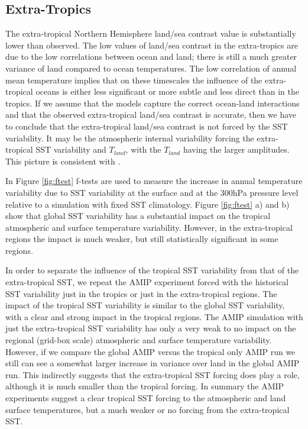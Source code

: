 
\subsection{Extra-Tropics}

The extra-tropical Northern Hemisphere land/sea contrast value is substantially 
lower than observed. The low values of land/sea contrast in the extra-tropics 
are due to the low correlations between ocean and land; there is still a much 
greater variance of land compared to ocean temperatures. The low correlation of 
annual mean temperature implies that on these timescales the influence of the 
extra-tropical oceans is either less significant or more subtle and less direct 
than in the tropics. If we assume that the models capture the correct ocean-land 
interactions and that the observed extra-tropical land/sea contrast is accurate, 	
then we have to conclude that the extra-tropical land/sea contrast is not forced 
by the SST variability. It may be the atmospheric internal variability forcing 
the extra-tropical SST variability and $T_{land}$, with the $T_{land}$ having 
the larger amplitudes. This picture is consistent with \citet{Barsugli1998}.

In Figure \ref{fig:ftest} f-tests are used to measure the increase in annual 
temperature variability due to SST variability at the surface and at the 300hPa 
pressure level relative to a simulation with fixed SST climatology. Figure  
\ref{fig:ftest} a) and b) show that global SST variability has a substantial 
impact on the tropical atmospheric and surface temperature variability. However, 
in the extra-tropical regions the impact is much weaker, but still statistically 
significant in some regions.

In order to separate the influence of the tropical SST variability from that of 
the extra-tropical SST, we repeat the AMIP experiment forced with the historical 
SST variability just in the tropics or just in the extra-tropical regions. The 
impact of the tropical SST variability is similar to the global SST variability, 
with a clear and strong impact in the tropical regions.  The AMIP simulation 
with just the extra-tropical SST variability has only a very weak to no impact 
on the regional (grid-box scale) atmospheric and surface temperature 
variability.  However, if we compare the global AMIP versus the tropical only 
AMIP run we still can see a somewhat larger increase in variance over land in 
the global AMIP run. This indirectly suggests that the extra-tropical SST 
forcing does play a role, although it is much smaller than the tropical forcing.  
In summary the AMIP experiments suggest a clear tropical SST forcing to the 
atmospheric and land surface temperatures, but a much weaker or no forcing from 
the extra-tropical SST.

